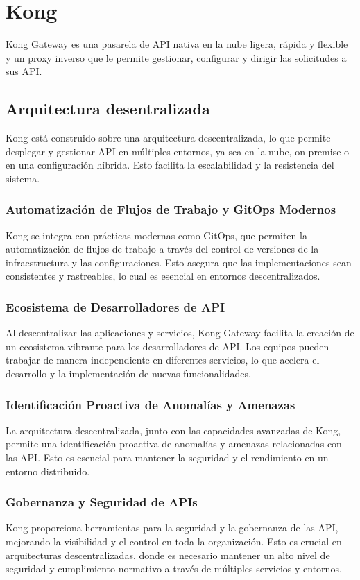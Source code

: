 \section{Kong}
Kong Gateway es una pasarela de API nativa en la nube ligera, rápida 
y flexible y un proxy inverso que le permite gestionar, configurar y 
dirigir las solicitudes a sus API.

\subsection{Arquitectura desentralizada}
Kong está construido sobre una arquitectura descentralizada, 
lo que permite desplegar y gestionar API en múltiples entornos, 
ya sea en la nube, on-premise o en una configuración híbrida. 
Esto facilita la escalabilidad y la resistencia del sistema.


\subsubsection{Automatización de Flujos de Trabajo y GitOps Modernos}
Kong se integra con prácticas modernas como GitOps, que permiten la automatización de 
flujos de trabajo a través del control de versiones de la infraestructura y las configuraciones. 
Esto asegura que las implementaciones sean consistentes y rastreables, lo cual es esencial en entornos descentralizados.

\subsubsection{Ecosistema de Desarrolladores de API}
Al descentralizar las aplicaciones y servicios, Kong Gateway facilita la creación 
de un ecosistema vibrante para los desarrolladores de API. Los equipos pueden 
trabajar de manera independiente en diferentes servicios, lo que acelera el 
desarrollo y la implementación de nuevas funcionalidades.

\subsubsection{Identificación Proactiva de Anomalías y Amenazas}
La arquitectura descentralizada, junto con las capacidades avanzadas de Kong, 
permite una identificación proactiva de anomalías y amenazas 
relacionadas con las API. Esto es esencial para mantener 
la seguridad y el rendimiento en un entorno distribuido.

\subsubsection{Gobernanza y Seguridad de APIs}
Kong proporciona herramientas para la seguridad y la gobernanza de las API, 
mejorando la visibilidad y el control en toda la organización. 
Esto es crucial en arquitecturas descentralizadas, donde es necesario mantener un 
alto nivel de seguridad y cumplimiento normativo a través de múltiples servicios y entornos.


